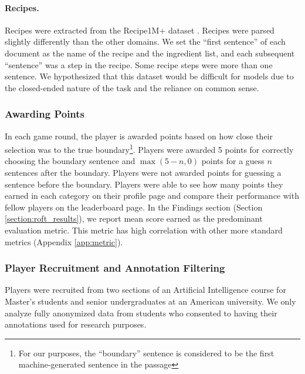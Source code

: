\paragraph{Recipes.}
Recipes were extracted from the Recipe1M+ dataset \cite{marin2019learning}.
Recipes were parsed slightly differently than the other domains.
We set the ``first sentence'' of each document as the name of the recipe and the ingredient list, and each subsequent ``sentence'' was a step in the recipe. Some recipe steps were more than one sentence. We hypothesized that this dataset would be difficult for models due to the closed-ended nature of the task and the reliance on common sense. 

\subsubsection{Awarding Points}
\label{sec:points}
In each game round, the player is awarded points based on how close their selection was to the true boundary\footnote{For our purposes, the ``boundary'' sentence is considered to be the first machine-generated sentence in the passage}.
Players were awarded 5 points for correctly choosing the boundary sentence and $\max(5-n, 0)$ points for a guess $n$ sentences after the boundary.
Players were not awarded points for guessing a sentence before the boundary.
Players were able to see how many points they earned in each category on their profile page and compare their performance with fellow players on the leaderboard page.
In the Findings section (Section \ref{section:roft_results}), we report mean score earned as the predominant evaluation metric. 
This metric has high correlation with other more standard metrics (Appendix \ref{app:metric}).

\subsubsection{Player Recruitment and Annotation Filtering}
\label{sec:players}
Players were recruited from two sections of an Artificial Intelligence course for Master's students and senior undergraduates at an American university.
We only analyze fully anonymized data from students who consented to having their annotations used for research purposes.

